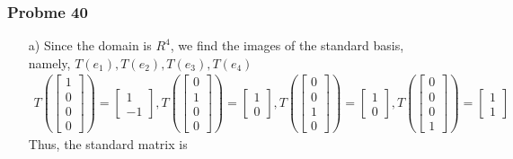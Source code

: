 \documentclass[a4paper,12pt]{article}
\begin{document}
\subsubsection*{Probme 40}
\begin{itemize}
    \item [a)] Since the domain is $R^4$, we find the images of the standard basis, \\namely, $T(e_1),T(e_2),T(e_3),T(e_4)$
\begin{align*}
    T\left( 
        \begin{bmatrix}
            1\\
            0\\
            0\\
            0
        \end{bmatrix}
    \right) = \begin{bmatrix}
        1\\
        -1
    \end{bmatrix}, T\left( 
        \begin{bmatrix}
            0\\
            1\\
            0\\
            0
        \end{bmatrix}
    \right) = \begin{bmatrix}
        1\\
        0
    \end{bmatrix}, T\left( 
        \begin{bmatrix}
            0\\
            0\\
            1\\
            0
        \end{bmatrix}
    \right) = \begin{bmatrix}
        1\\
        0
    \end{bmatrix}, T\left( 
        \begin{bmatrix}
            0\\
            0\\
            0\\
            1
        \end{bmatrix}
    \right) = \begin{bmatrix}
        1\\
        1
    \end{bmatrix}
\end{align*}
Thus, the standard matrix is

\end{itemize}
\end{document}
